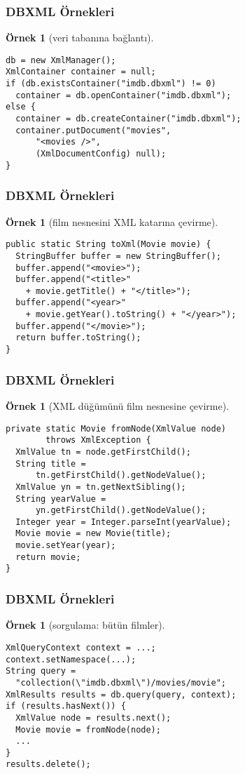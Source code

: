 \documentclass[dvipsnames]{beamer}
\theoremstyle{definition}
\theoremstyle{example}
\newtheorem{ornek}[theorem]{Örnek}
\theoremstyle{plain}
\begin{document}
\begin{frame}[fragile]
  \frametitle{DBXML Örnekleri}

  \begin{ornek}[veri tabanına bağlantı]
    \begin{lstlisting}
db = new XmlManager();
XmlContainer container = null;
if (db.existsContainer("imdb.dbxml") != 0)
  container = db.openContainer("imdb.dbxml");
else {
  container = db.createContainer("imdb.dbxml");
  container.putDocument("movies",
      "<movies />",
      (XmlDocumentConfig) null);
}
    \end{lstlisting}
  \end{ornek}
\end{frame}

\begin{frame}[fragile]
  \frametitle{DBXML Örnekleri}

  \begin{ornek}[film nesnesini XML katarına çevirme]
    \begin{lstlisting}
public static String toXml(Movie movie) {
  StringBuffer buffer = new StringBuffer();
  buffer.append("<movie>");
  buffer.append("<title>"
    + movie.getTitle() + "</title>");
  buffer.append("<year>"
    + movie.getYear().toString() + "</year>");
  buffer.append("</movie>");
  return buffer.toString();
}
    \end{lstlisting}
  \end{ornek}
\end{frame}

\begin{frame}[fragile]
  \frametitle{DBXML Örnekleri}

  \begin{ornek}[XML düğümünü film nesnesine çevirme]
    \begin{lstlisting}
private static Movie fromNode(XmlValue node)
        throws XmlException {
  XmlValue tn = node.getFirstChild();
  String title =
      tn.getFirstChild().getNodeValue();
  XmlValue yn = tn.getNextSibling();
  String yearValue =
      yn.getFirstChild().getNodeValue();
  Integer year = Integer.parseInt(yearValue);
  Movie movie = new Movie(title);
  movie.setYear(year);
  return movie;
}
    \end{lstlisting}
  \end{ornek}
\end{frame}

\begin{frame}[fragile]
  \frametitle{DBXML Örnekleri}

  \begin{ornek}[sorgulama: bütün filmler]
    \begin{lstlisting}
XmlQueryContext context = ...;
context.setNamespace(...);
String query =
  "collection(\"imdb.dbxml\")/movies/movie";
XmlResults results = db.query(query, context);
if (results.hasNext()) {
  XmlValue node = results.next();
  Movie movie = fromNode(node);
  ...
}
results.delete();
    \end{lstlisting}
  \end{ornek}
\end{frame}
\end{document}
